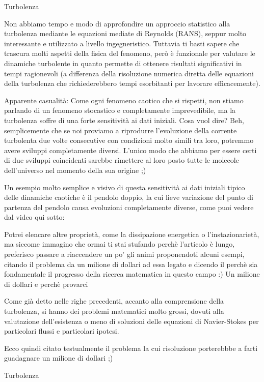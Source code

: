 Turbolenza

Non abbiamo tempo e modo di approfondire un approccio statistico alla turbolenza mediante le equazioni mediate di Reynolds (RANS), seppur molto interessante e utilizzato a livello ingegneristico. Tuttavia ti basti sapere che trascura molti aspetti della fisica del fenomeno, però è funzionale per valutare le dinamiche turbolente in quanto permette di ottenere risultati significativi in tempi ragionevoli (a differenza della risoluzione numerica diretta delle equazioni della turbolenza che richiederebbero tempi esorbitanti per lavorare efficacemente).

Apparente casualità: Come ogni fenomeno caotico che si rispetti, non stiamo parlando di un fenomeno stocastico e completamente imprevedibile, ma la turbolenza soffre di una forte sensitività ai dati iniziali. Cosa vuol dire? Beh, semplicemente che se noi proviamo a riprodurre l'evoluzione della corrente turbolenta due volte consecutive con condizioni molto simili tra loro, potremmo avere sviluppi completamente diversi. L'unico modo che abbiamo per essere certi di due sviluppi coincidenti sarebbe rimettere al loro posto tutte le molecole dell'universo nel momento della sua origine ;)

Un esempio molto semplice e visivo di questa sensitività ai dati iniziali tipico delle dinamiche caotiche è il pendolo doppio, la cui lieve variazione del punto di partenza del pendolo causa evoluzioni completamente diverse, come puoi vedere dal video qui sotto:



Potrei elencare altre proprietà, come la dissipazione energetica o l'instazionarietà, ma siccome immagino che ormai ti stai stufando perchè l'articolo è lungo, preferisco passare a riaccendere un po' gli animi proponendoti alcuni esempi, citando il problema da un milione di dollari ad essa legato e dicendo il perchè sia fondamentale il progresso della ricerca matematica in questo campo :)
Un milione di dollari e perchè provarci

Come già detto nelle righe precedenti, accanto alla comprensione della turbolenza, si hanno dei problemi matematici molto grossi, dovuti alla valutazione dell'esistenza o meno di soluzioni delle equazioni di Navier-Stokes per particolari flussi e particolari ipotesi.

Ecco quindi citato testualmente il problema la cui risoluzione porterebbbe a farti guadagnare un milione di dollari ;)

Turbolenza

